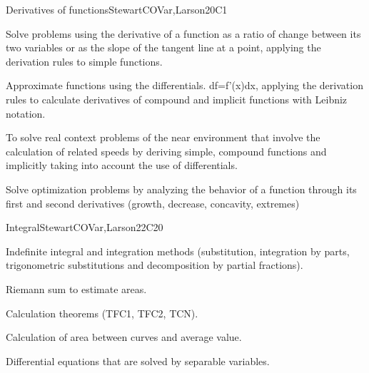 \begin{syllabus}
\begin{unit}{Derivatives of functions}{}{StewartCOVar,Larson}{20}{C1}
   \begin{learningoutcomes}
      \item Solve problems using the derivative of a function as a ratio of change between its two variables or as the slope of the tangent line at a point, applying the derivation rules to simple functions.
      \item Approximate functions using the differentials. df=f'(x)dx, applying the derivation rules to calculate derivatives of compound and implicit functions with Leibniz notation.
      \item To solve real context problems of the near environment that involve the calculation of related speeds by deriving simple, compound functions and implicitly taking into account the use of differentials.
      \item Solve optimization problems by analyzing the behavior of a function through its first and second derivatives (growth, decrease, concavity, extremes)
   \end{learningoutcomes}
\end{unit}

\begin{unit}{Integral}{}{StewartCOVar,Larson}{22}{C20}
   \begin{topics}
      \item Indefinite integral and integration methods (substitution, integration by parts, trigonometric substitutions and decomposition by partial fractions).
      \item Riemann sum to estimate areas.
      \item Calculation theorems (TFC1, TFC2, TCN).
      \item Calculation of area between curves and average value.
      \item Differential equations that are solved by separable variables.
   \end{topics}


\end{unit}
\end{syllabus}
